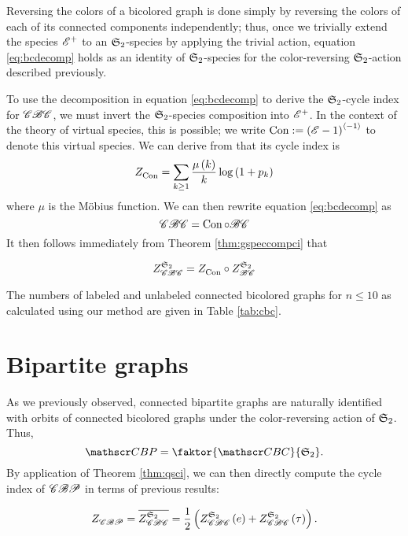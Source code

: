 \documentclass[distribution,draft]{brandiss} %
\numberwithin{section}{chapter}
\numberwithin{figure}{chapter}
\begin{document}
Reversing the colors of a bicolored graph is done simply by reversing the colors of each of its connected components independently; thus, once we trivially extend the species $\specname{E}^{+}$ to an $\symgp{2}$-species by applying the trivial action, equation \eqref{eq:bcdecomp} holds as an identity of $\symgp{2}$-species for the color-reversing $\symgp{2}$-action described previously.

To use the decomposition in equation \eqref{eq:bcdecomp} to derive the $\symgp{2}$-cycle index for $\specname{CBC}$, we must invert the $\symgp{2}$-species composition into $\specname{E}^{+}$.
In the context of the theory of virtual species, this is possible; we write $\con := \pbrac{\specname{E} - 1}^{\abrac{-1}}$ to denote this virtual species.
We can derive from \cite[\S 2.5, eq.~(58c)]{bll:species} that its cycle index is
\begin{equation}
  \label{eq:zgamma}
  \ci{\con} = \sum_{k \geq 1} \frac{\mu \pbrac{k}}{k} \log \pbrac{1 + p_{k}}
\end{equation}
where $\mu$ is the M\"{o}bius function.
We can then rewrite equation \eqref{eq:bcdecomp} as
\[\specname{CBC} = \con \circ \specname{BC}\]
It then follows immediately from Theorem \ref{thm:gspeccompci} that
\begin{theorem}
  \begin{equation} \gci{\symgp{2}}{\specname{CBC}} = \ci{\con} \circ \gci{\symgp{2}}{\specname{BC}} \label{eq:zcbcdecomp} \end{equation}
\end{theorem}

The numbers of labeled and unlabeled connected bicolored graphs for $n \leq 10$ as calculated using our method are given in Table \ref{tab:cbc}.

\section{Bipartite graphs}\label{s:bp}
As we previously observed, connected bipartite graphs are naturally identified with orbits of connected bicolored graphs under the color-reversing action of $\symgp{2}$.
Thus,
\begin{equation*}
  \specname{CBP} = \faktor{\specname{CBC}}{\symgp{2}}.
\end{equation*}
By application of Theorem \ref{thm:qsci}, we can then directly compute the cycle index of $\specname{CBP}$ in terms of previous results:
\begin{theorem}
  \begin{equation}
    \ci{\specname{CBP}} = \qgci{\symgp{2}}{\specname{CBC}} = \frac{1}{2} \pbrac{\gcielt{\symgp{2}}{\specname{CBC}}{e} + \gcielt{\symgp{2}}{\specname{CBC}}{\tau}}.
  \end{equation}
\end{theorem}
\end{document}
